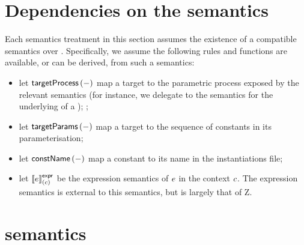 \section{Dependencies on the \robochart{} semantics}

\newcommand{\targetProcess}[1]{\ensuremath{\funcname{targetProcess}\left(#1\right)}}
\newcommand{\targetParams}[1]{\ensuremath{\funcname{targetParams}\left(#1\right)}}
\newcommand{\constName}[1]{\ensuremath{\funcname{constName}\left(#1\right)}}


Each semantics treatment in this section assumes the existence of a compatible
semantics over \robochart.  Specifically, we assume the following rules and
functions are available, or can be derived, from such a semantics:

\begin{itemize}
\item
	let \targetProcess{-} map a target to the parametric
	process exposed by the relevant \tockcsp{} semantics (for instance,
	we delegate to the \robochart{} semantics for the underlying
	\mrcmodule{} of a \mrcmoduletarget);
	;
\item
	let \targetParams{-} map a target to the sequence of
	constants in its parameterisation;
\item
	let \constName{-} map a constant to its name in the \robochart{}
	instantiations file;
\item
	let \(\llbracket e \rrbracket^{\mathsf{expr}}_{(c)}\) be the expression semantics of 
	\(e\) in the context \(c\).  The expression semantics
	is external to this semantics, but is largely that of Z.
\end{itemize}

\section{\tockcsp{} semantics}\label{sec:semantics-tockcsp}


